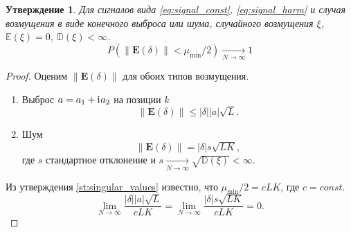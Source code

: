 \documentclass[specialist,
               substylefile = spbu.rtx,
               subf,href,colorlinks=true, 12pt]{disser}
\newtheorem{statement}{Утверждение}
\begin{document}
\begin{statement} \label{st:cond_compl}
	Для сигналов вида \eqref{eq:signal_const}, \eqref{eq:signal_harm} и случая возмущения в виде конечного выброса или шума, случайного возмущения $\xi$, $\mathbb{E}(\xi) = 0$, $\mathbb{D}(\xi) < \infty$.
	$$P(\|\mathbf{E}(\delta)\| < \mu_{\min} / 2) \xrightarrow[N \rightarrow \infty]{} 1$$
\end{statement}
\begin{proof}
	Оценим $\|\mathbf{E}(\delta)\|$ для обоих типов возмущения.
	\begin{enumerate}
		\item Выброс $a = a_1 + \mathrm{i}\mkern1mu a_2$ на позиции $k$
		$$\|\mathbf{E}(\delta)\| \leq |\delta||a|\sqrt{L}.$$
		\item Шум
		$$\|\mathbf{E}(\delta)\| = |\delta| s \sqrt{LK},$$
		где $s$ стандартное отклонение и $s \xrightarrow[N \rightarrow \infty]{} \sqrt{\mathbb{D}(\xi)} < \infty$.
	\end{enumerate}
	Из утверждения \ref{st:singular_values} известно, что $\mu_{\min} / 2 = cLK$, где $c = const$.
	$$\lim_{N \rightarrow \infty} \frac{|\delta||a|\sqrt{L}}{cLK} = \lim_{N \rightarrow \infty} \frac{|\delta| s \sqrt{LK}}{cLK} = 0.$$
\end{proof}
\end{document}
